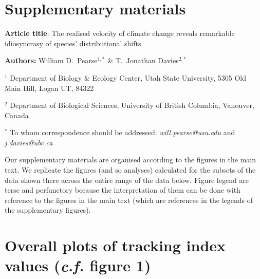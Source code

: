 \documentclass[12pt]{report}
\begin{document}
\section*{Supplementary materials}
\textbf{Article title}: The realised velocity of climate change
reveals remarkable idiosyncrasy of species' distributional shifts

\textbf{Authors:} William D.\ Pearse$^{1,*}$ \& T.\ Jonathan
Davies$^{2,*}$

$^1$ Department of Biology \& Ecology Center, Utah State University,
5305 Old Main Hill, Logan UT, 84322

$^2$ Department of Biological Sciences, University of British
Columbia, Vanouver, Canada

$^*$ To whom correspondence should be addressed:
\emph{will.pearse@usu.edu} and \emph{j.davies@ubc.ca}

\clearpage

Our supplementary materials are organised according to the figures in
the main text. We replicate the figures (and so analyses) calculated
for the subsets of the data shown there across the entire range of the
data below. Figure legend are terse and perfunctory because the
interpretation of them can be done with reference to the figures in
the main text (which are references in the legends of the
supplementary figures).

\clearpage
\section{Overall plots of tracking index values (\emph{c.f.} figure 1)}
\end{document}
